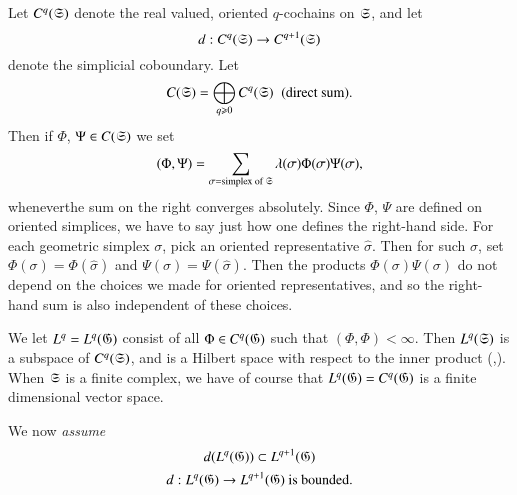 Let $C^q (\mathfrak{S})$ denote the real valued, oriented $q$-cochains on $\mathfrak{S}$, and let 
$$
d : C^q (\mathfrak{S}) \to C^{q+1} (\mathfrak{S})
$$
denote the simplicial coboundary. Let
$$
C (\mathfrak{S}) = \bigoplus_{q \geqslant 0} C^q (\mathfrak{S})\;\; (\text{direct sum}).
$$
Then if $\Phi$, $\Psi \in C (\mathfrak{S})$ we set
$$
(\Phi, \Psi) = \sum\limits_{\sigma = \text{simplex of $\mathfrak{S}$}}  \lambda (\sigma) \Phi (\sigma) \Psi (\sigma),
$$
whenever\pageoriginale  the sum on the right converges absolutely. Since $\Phi$, $\Psi$ are defined on oriented simplices, we have to say just how one defines the right-hand side. For each geometric simplex $\sigma$, pick an oriented representative $\hat{\sigma}$. Then for such $\sigma$, set $\Phi(\sigma) = \Phi(\hat{\sigma})$ and $\Psi(\sigma) = \Psi (\hat{\sigma})$. Then the products $\Phi(\sigma) \Psi (\sigma)$ do not depend on the choices we made for oriented representatives, and so the right-hand sum is also independent of these choices.

We let $L^q = L^q (\mathfrak{G})$ consist of all $\Phi\in C^q (\mathfrak{G})$ such that $(\Phi, \Phi) < \infty$. Then $L^q(\mathfrak{S})$ is a subspace of $C^q (\mathfrak{S})$, and is a Hilbert space with respect to the inner product (,). When $\mathfrak{S}$ is a finite complex, we have of course that $L^q (\mathfrak{G}) = C^q (\mathfrak{G})$ is a finite dimensional vector space.

We now \textit{assume}
\begin{gather}
d(L^q (\mathfrak{G})) \subset L^{q+1} (\mathfrak{G})\notag\\
d: L^q (\mathfrak{G}) \to L^{q+1} (\mathfrak{G}) \text{ is bounded.} \label{art3-eq4.2}
\end{gather}

